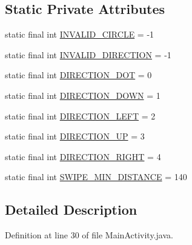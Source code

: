 \subsection*{Static Private Attributes}
\begin{DoxyCompactItemize}
\item 
static final int \hyperlink{classcom_1_1example_1_1multitouchsample_1_1_main_activity_1_1_my_view_a90558b5e086112625e29f3941b1444d8}{I\+N\+V\+A\+L\+I\+D\+\_\+\+C\+I\+R\+C\+L\+E} = -\/1
\item 
static final int \hyperlink{classcom_1_1example_1_1multitouchsample_1_1_main_activity_1_1_my_view_a1b17ab3dd378a4846a8de05a58fce3db}{I\+N\+V\+A\+L\+I\+D\+\_\+\+D\+I\+R\+E\+C\+T\+I\+O\+N} = -\/1
\item 
static final int \hyperlink{classcom_1_1example_1_1multitouchsample_1_1_main_activity_1_1_my_view_ad91938a7ac9667ccd247a072f338a2de}{D\+I\+R\+E\+C\+T\+I\+O\+N\+\_\+\+D\+O\+T} = 0
\item 
static final int \hyperlink{classcom_1_1example_1_1multitouchsample_1_1_main_activity_1_1_my_view_afc3ae0a948391b36141f78c515622217}{D\+I\+R\+E\+C\+T\+I\+O\+N\+\_\+\+D\+O\+W\+N} = 1
\item 
static final int \hyperlink{classcom_1_1example_1_1multitouchsample_1_1_main_activity_1_1_my_view_aad2a71c46e7cad809a27eb9c4c2600d9}{D\+I\+R\+E\+C\+T\+I\+O\+N\+\_\+\+L\+E\+F\+T} = 2
\item 
static final int \hyperlink{classcom_1_1example_1_1multitouchsample_1_1_main_activity_1_1_my_view_a43c4159b9b295cfea731211ac614fc0b}{D\+I\+R\+E\+C\+T\+I\+O\+N\+\_\+\+U\+P} = 3
\item 
static final int \hyperlink{classcom_1_1example_1_1multitouchsample_1_1_main_activity_1_1_my_view_a2d1dd293bf4c64feec7de128ef21739e}{D\+I\+R\+E\+C\+T\+I\+O\+N\+\_\+\+R\+I\+G\+H\+T} = 4
\item 
static final int \hyperlink{classcom_1_1example_1_1multitouchsample_1_1_main_activity_1_1_my_view_a677194aa1ca850fc0e716d725f691ba1}{S\+W\+I\+P\+E\+\_\+\+M\+I\+N\+\_\+\+D\+I\+S\+T\+A\+N\+C\+E} = 140
\end{DoxyCompactItemize}


\subsection{Detailed Description}


Definition at line 30 of file Main\+Activity.\+java.



